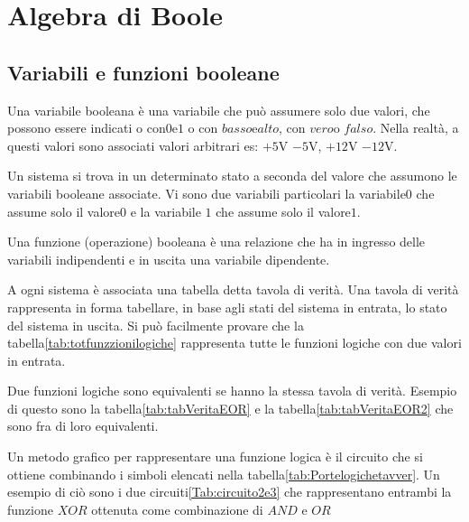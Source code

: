 \chapter{Algebra di Boole}
\label{cha:AlgebradiBoole}
\minitoc
\mtcskip                                %
\minilof                                %
\mtcskip                                %
\minilot
\FloatBarrier
\section{Variabili e funzioni booleane}
\label{sec:VariabiliBooleane}
Una variabile booleana è una variabile che può assumere solo due valori, che possono essere indicati o  con\nobs$0$\nobs e\nobs$1$ o con $basso$\nobs e\nobs$alto$, con $vero$\nobs o \nobs$falso$. Nella realtà, a questi valori sono  associati valori arbitrari es: $+5\si{\volt}$ $-5\si{\volt}$, $+12\si{\volt}$ $-12\si{\volt}$. 

 Un sistema si trova in un determinato stato a seconda del valore che assumono le variabili booleane associate.   Vi sono due variabili  particolari la variabile\nobs$0$ che assume solo il valore\nobs$0$ e la variabile \nobs$1$ che assume solo il valore\nobs$1$. 

Una funzione (operazione) booleana è una relazione  che ha in ingresso delle variabili indipendenti e in uscita una variabile dipendente.

A ogni sistema è associata una tabella detta tavola di verità. Una tavola di verità rappresenta in forma tabellare, in base agli stati del sistema in entrata, lo stato del sistema in uscita. Si può facilmente provare %
che la tabella\vref{tab:totfunzzionilogiche} rappresenta tutte le funzioni logiche con due valori in entrata.

Due funzioni logiche sono equivalenti se hanno la stessa tavola di verità. Esempio di questo sono la tabella\nobs\vref{tab:tabVeritaEOR} e la tabella\nobs\vref{tab:tabVeritaEOR2} che sono fra di loro equivalenti. 

Un metodo grafico per rappresentare una funzione logica  è il circuito che si ottiene combinando i simboli  elencati nella tabella\nobs\vref{tab:Portelogichetavver}. Un esempio di ciò sono  i due circuiti\nobs\vref{Tab:circuito2e3} che rappresentano entrambi la funzione $XOR$  ottenuta come combinazione di $AND$ e $OR$

